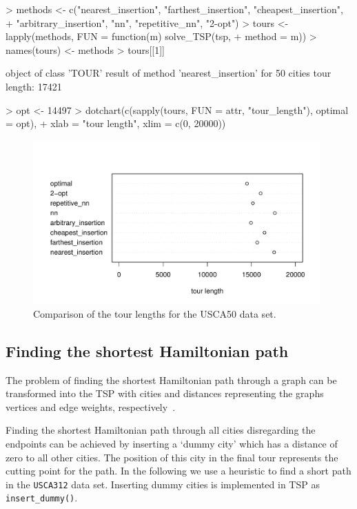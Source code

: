 \documentclass[10pt,a4paper,fleqn]{article}
\newcommand{\strong}[1]{{\normalfont\fontseries{b}\selectfont #1}}
\newcommand{\func}[1]{\mbox{\texttt{#1()}}}
\newcommand{\code}[1]{\mbox{\texttt{#1}}}
\newcommand{\pkg}[1]{\strong{#1}}
\begin{document}
\begin{Schunk}
\begin{Sinput}
> methods <- c("nearest_insertion", "farthest_insertion", "cheapest_insertion", 
+     "arbitrary_insertion", "nn", "repetitive_nn", "2-opt")
> tours <- lapply(methods, FUN = function(m) solve_TSP(tsp, 
+     method = m))
> names(tours) <- methods
> tours[[1]]
\end{Sinput}
\begin{Soutput}
object of class 'TOUR' 
result of method 'nearest_insertion' for 50 cities
tour length: 17421 
\end{Soutput}
\begin{Sinput}
> opt <- 14497
> dotchart(c(sapply(tours, FUN = attr, "tour_length"), optimal = opt), 
+     xlab = "tour length", xlim = c(0, 20000))
\end{Sinput}
\end{Schunk}

\begin{figure}
\centering
\includegraphics[width=11cm, trim=0 10 0 0]{TSP-dotchart_USCA50}
\caption{Comparison of the tour lengths for the USCA50 data set.}
\label{fig:dotchart}
\end{figure}


\subsection{Finding the shortest Hamiltonian path}

The problem of finding the shortest Hamiltonian path through a graph can be
transformed into the TSP with cities and distances representing the graphs
vertices and edge weights, respectively~\citep{Garfinkel1985}. 

Finding the shortest Hamiltonian path through all cities disregarding
the endpoints can be achieved by inserting a `dummy city' which has a
distance of zero to all other cities. The position of this city in the
final tour represents the cutting point for the path. In the following
we use a heuristic to find a short path in the \code{USCA312} data set.
Inserting dummy cities is implemented in \pkg{TSP} as
\func{insert\_dummy}.
\end{document}
